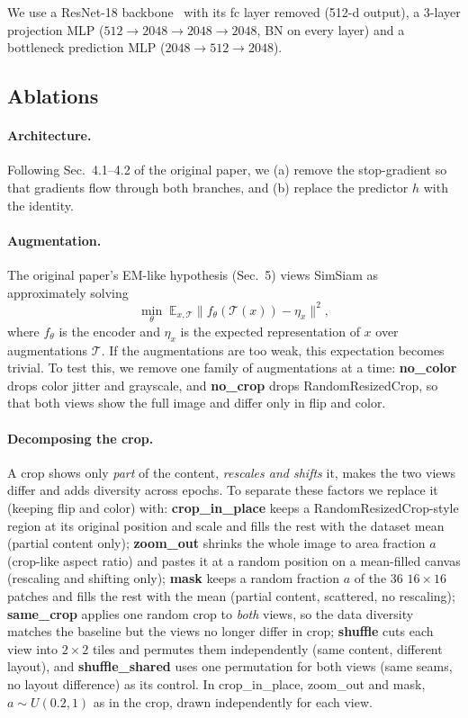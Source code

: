 \documentclass[10pt,twocolumn,letterpaper]{article}
\begin{document}
We use a ResNet-18 backbone~\cite{he2016resnet} with its fc layer removed (512-d output), a 3-layer projection MLP ($512\!\to\!2048\!\to\!2048\!\to\!2048$, BN on every layer) and a bottleneck prediction MLP ($2048\!\to\!512\!\to\!2048$).

\subsection{Ablations}
\paragraph{Architecture.}
Following Sec.~4.1--4.2 of the original paper, we (a) remove the stop-gradient so that gradients flow through both branches, and (b) replace the predictor $h$ with the identity.

\paragraph{Augmentation.}
The original paper's EM-like hypothesis (Sec.~5) views SimSiam as approximately solving
\begin{equation}
\min_\theta\; \mathbb{E}_{x,\mathcal{T}}\bigl\|f_\theta(\mathcal{T}(x))-\eta_x\bigr\|^2,
\label{eq:em}
\end{equation}
where $f_\theta$ is the encoder and $\eta_x$ is the expected representation of $x$ over augmentations $\mathcal{T}$.
If the augmentations are too weak, this expectation becomes trivial.
To test this, we remove one family of augmentations at a time:
\textbf{no\_color} drops color jitter and grayscale, and \textbf{no\_crop} drops RandomResizedCrop, so that both views show the full image and differ only in flip and color.

\paragraph{Decomposing the crop.}
A crop shows only \emph{part} of the content, \emph{rescales and shifts} it, makes the two views differ and adds diversity across epochs. To separate these factors we replace it (keeping flip and color) with:
\textbf{crop\_in\_place} keeps a RandomResizedCrop-style region at its original position and scale and fills the rest with the dataset mean (partial content only);
\textbf{zoom\_out} shrinks the whole image to area fraction $a$ (crop-like aspect ratio) and pastes it at a random position on a mean-filled canvas (rescaling and shifting only);
\textbf{mask} keeps a random fraction $a$ of the 36 $16\!\times\!16$ patches and fills the rest with the mean (partial content, scattered, no rescaling);
\textbf{same\_crop} applies one random crop to \emph{both} views, so the data diversity matches the baseline but the views no longer differ in crop;
\textbf{shuffle} cuts each view into $2\!\times\!2$ tiles and permutes them independently (same content, different layout), and \textbf{shuffle\_shared} uses one permutation for both views (same seams, no layout difference) as its control.
In crop\_in\_place, zoom\_out and mask, $a\sim U(0.2,1)$ as in the crop, drawn independently for each view.
\end{document}
